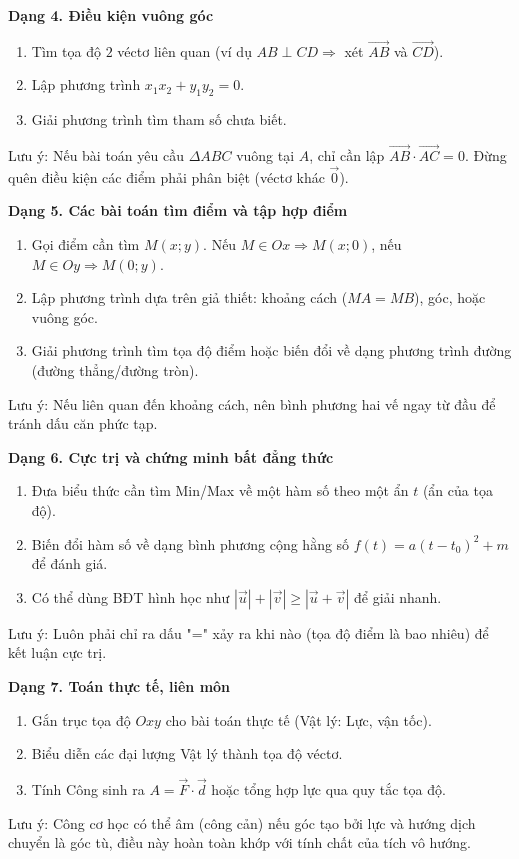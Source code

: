 \textbf{Dạng 4. Điều kiện vuông góc}
\begin{enumerate}
\item Tìm tọa độ $2$ véctơ liên quan (ví dụ $AB \perp CD \Rightarrow$ xét $\overrightarrow{AB}$ và $\overrightarrow{CD}$).
\item Lập phương trình $x_1 x_2 + y_1 y_2 = 0$.
\item Giải phương trình tìm tham số chưa biết.
\end{enumerate}
Lưu ý: Nếu bài toán yêu cầu $\Delta ABC$ vuông tại $A$, chỉ cần lập $\overrightarrow{AB} \cdot \overrightarrow{AC} = 0$. Đừng quên điều kiện các điểm phải phân biệt (véctơ khác $\vec{0}$).

\textbf{Dạng 5. Các bài toán tìm điểm và tập hợp điểm}
\begin{enumerate}
\item Gọi điểm cần tìm $M(x; y)$. Nếu $M \in Ox \Rightarrow M(x; 0)$, nếu $M \in Oy \Rightarrow M(0; y)$.
\item Lập phương trình dựa trên giả thiết: khoảng cách ($MA = MB$), góc, hoặc vuông góc.
\item Giải phương trình tìm tọa độ điểm hoặc biến đổi về dạng phương trình đường (đường thẳng/đường tròn).
\end{enumerate}
Lưu ý: Nếu liên quan đến khoảng cách, nên bình phương hai vế ngay từ đầu để tránh dấu căn phức tạp.

\textbf{Dạng 6. Cực trị và chứng minh bất đẳng thức}
\begin{enumerate}
\item Đưa biểu thức cần tìm Min/Max về một hàm số theo một ẩn $t$ (ẩn của tọa độ).
\item Biến đổi hàm số về dạng bình phương cộng hằng số $f(t) = a(t - t_0)^2 + m$ để đánh giá.
\item Có thể dùng BĐT hình học như $|\vec{u}| + |\vec{v}| \ge |\vec{u} + \vec{v}|$ để giải nhanh.
\end{enumerate}
Lưu ý: Luôn phải chỉ ra dấu "=" xảy ra khi nào (tọa độ điểm là bao nhiêu) để kết luận cực trị.

\textbf{Dạng 7. Toán thực tế, liên môn}
\begin{enumerate}
\item Gắn trục tọa độ $Oxy$ cho bài toán thực tế (Vật lý: Lực, vận tốc).
\item Biểu diễn các đại lượng Vật lý thành tọa độ véctơ.
\item Tính Công sinh ra $A = \vec{F} \cdot \vec{d}$ hoặc tổng hợp lực qua quy tắc tọa độ.
\end{enumerate}
Lưu ý: Công cơ học có thể âm (công cản) nếu góc tạo bởi lực và hướng dịch chuyển là góc tù, điều này hoàn toàn khớp với tính chất của tích vô hướng.
